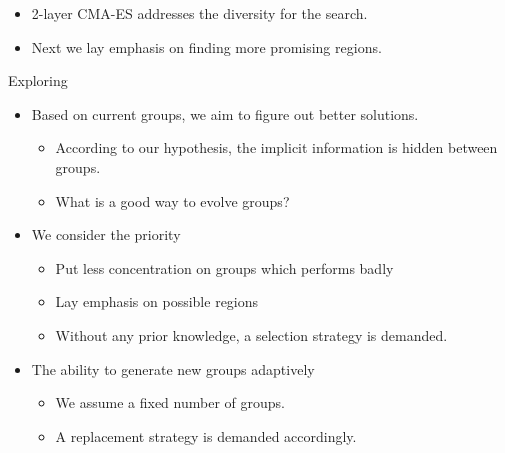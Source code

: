 \begin{frame}
  \begin{itemize}
    \item 2-layer CMA-ES addresses the diversity for the search.
      \vspace*{14pt}
    \item Next we lay emphasis on finding more promising regions.
  \end{itemize}

\end{frame}

\begin{frame}{Exploring}
  \begin{itemize}
    \item Based on current groups, we aim to figure out better
      solutions.
      \begin{itemize}
        \item According to our hypothesis, the implicit information is
          hidden between groups.
        \item What is a good way to evolve groups?
      \end{itemize}
      \vspace*{14pt}
    \item We consider the priority
      \begin{itemize}
        \item Put less concentration on groups which performs badly
        \item Lay emphasis on possible regions
        \item Without any prior knowledge, a selection strategy is
          demanded.
      \end{itemize}
      \vspace*{14pt}
    \item The ability to generate new groups adaptively 
      \begin{itemize}
        \item We assume a fixed number of groups.
        \item A replacement strategy is demanded accordingly.
      \end{itemize}
  \end{itemize}
\end{frame}

